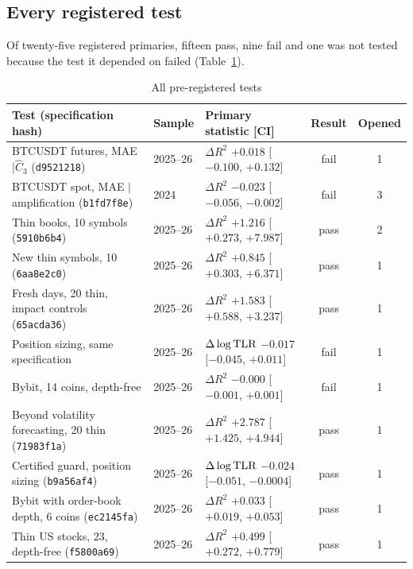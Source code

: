     \subsection{Every registered test}\label{p2:sec:alltests}
    Of twenty-five registered primaries, fifteen pass, nine fail and one was not tested because the test it depended on failed (Table~\ref{p2:tab:alltests}).
    
\begin{table}[!htbp]\centering\footnotesize\renewcommand{\arraystretch}{0.80}\setlength{\abovecaptionskip}{3pt}
\begin{threeparttable}
\caption{All pre-registered tests}\label{p2:tab:alltests}
\setlength{\tabcolsep}{3pt}
\begin{tabular}{p{}lp{}cc}
\toprule
Test (specification hash) & Sample & Primary statistic [CI] & Result & Opened\\
\midrule
BTCUSDT futures, MAE $\mid\hat C_3$ (\texttt{d9521218}) & 2025--26 & $\Delta R^2$ $+0.018$ [$-0.100$, $+0.132$] & fail & 1\\
BTCUSDT spot, MAE $\mid$ amplification (\texttt{b1fd7f8e}) & 2024 & $\Delta R^2$ $-0.023$ [$-0.056$, $-0.002$] & fail & 3\\
Thin books, 10 symbols (\texttt{5910b6b4}) & 2025--26 & $\Delta R^2$ $+1.216$ [$+0.273$, $+7.987$] & pass & 2\\
New thin symbols, 10 (\texttt{6aa8e2c0}) & 2025--26 & $\Delta R^2$ $+0.845$ [$+0.303$, $+6.371$] & pass & 1\\
Fresh days, 20 thin, impact controls (\texttt{65acda36}) & 2025--26 & $\Delta R^2$ $+1.583$ [$+0.588$, $+3.237$] & pass & 1\\
Position sizing, same specification & 2025--26 & $\Delta\log{\rm TLR}$ $-0.017$ [$-0.045$, $+0.011$] & fail & 1\\
Bybit, 14 coins, depth-free & 2025--26 & $\Delta R^2$ $-0.000$ [$-0.001$, $+0.001$] & fail & 1\\
Beyond volatility forecasting, 20 thin (\texttt{71983f1a}) & 2025--26 & $\Delta R^2$ $+2.787$ [$+1.425$, $+4.944$] & pass & 1\\
Certified guard, position sizing (\texttt{b9a56af4}) & 2025--26 & $\Delta\log{\rm TLR}$ $-0.024$ [$-0.051$, $-0.0004$] & pass & 1\\
Bybit with order-book depth, 6 coins (\texttt{ec2145fa}) & 2025--26 & $\Delta R^2$ $+0.033$ [$+0.019$, $+0.053$] & pass & 1\\
Thin US stocks, 23, depth-free (\texttt{f5800a69}) & 2025--26 & $\Delta R^2$ $+0.499$ [$+0.272$, $+0.779$] & pass & 1\\

\end{tabular}
\end{threeparttable}
\end{table}

